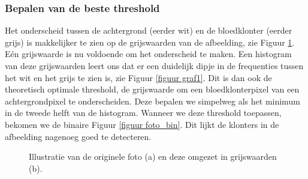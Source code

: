 \documentclass[a4paper,kulak]{kulakarticle}
\begin{document}
\subsubsection{Bepalen van de beste threshold}
Het onderscheid tussen de achtergrond (eerder wit) en de bloedklonter (eerder grijs) is makkelijker te zien op de grijswaarden van de afbeelding, zie Figuur \ref{figuur beste_threshold}. Eén grijswaarde is nu voldoende om het onderscheid te maken. Een histogram van deze grijswaarden leert ons dat er een duidelijk dipje in de frequenties tussen het wit en het grijs te zien is, zie Figuur \ref{figuur graf1}. Dit is dan ook de theoretisch optimale threshold, de grijswaarde om een bloedklonterpixel van een achtergrondpixel te onderscheiden. Deze bepalen we simpelweg als het minimum in de tweede helft van de histogram. Wanneer we deze threshold toepassen, bekomen we de binaire Figuur \ref{figuur foto_bin}. Dit lijkt de klonters in de afbeelding nagenoeg goed te detecteren.

\begin{figure}[H]
	\centering
	\qquad
	
	\caption{Illustratie van de originele foto (a) en deze omgezet in grijswaarden (b).}
	\label{figuur beste_threshold}
\end{figure}
\end{document}
